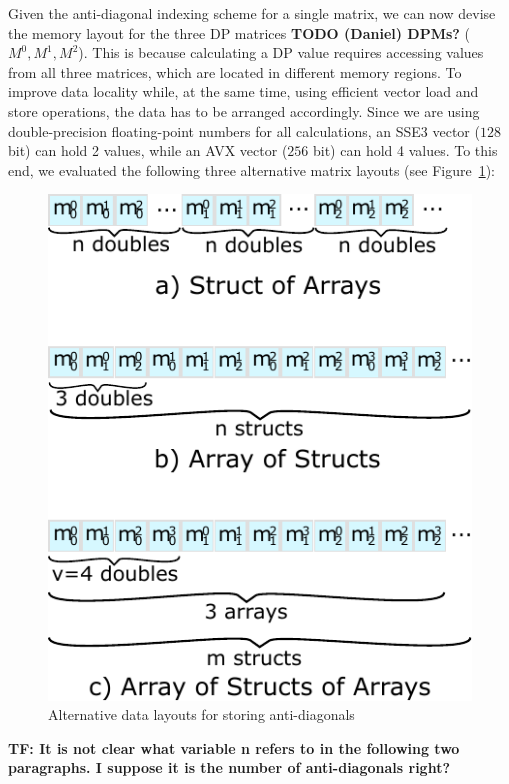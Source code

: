 \documentclass[runningheads,a4paper]{llncs}
\begin{document}
Given the anti-diagonal indexing scheme for a single matrix, we can now
devise the memory layout for the three DP matrices {\bf TODO (Daniel) DPMs?} ($M^0,M^1,M^2$).
This is because calculating a DP value requires
accessing values from all three matrices, which are located in different
memory regions.
To improve data locality while, at the same time, using efficient
vector load and store operations,
the data has to be arranged accordingly.  Since we are using
double-precision floating-point numbers for all calculations, an SSE3 vector
($128$ bit) can hold 2 values, while an AVX vector ($256$ bit) can hold 4 values.
To this end, we evaluated the following three alternative matrix layouts (see Figure~\ref{fig:datalayout}):

\begin{figure}[ht!]
  \centering
  \includegraphics[scale=0.7]{figures/datalayout.pdf}
  \caption{Alternative data layouts for storing anti-diagonals}
  \label{fig:datalayout}
\end{figure}

\textbf{TF: It is not clear what variable n refers to in the following two paragraphs. I suppose it is the number of anti-diagonals right?}
\end{document}
